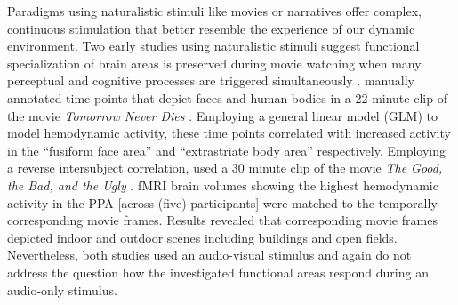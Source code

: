 \documentclass[english]{article}
\begin{document}
Paradigms using naturalistic stimuli like movies
\citep{hasson2008neurocinematics, sonkusare2019naturalistic} or narratives
\citep{honey2012not, lerner2011topographic, silbert2014coupled} offer complex,
continuous stimulation that better resemble the experience of our dynamic
environment.
Two early studies using naturalistic stimuli suggest functional specialization
of brain areas is preserved during movie watching when many perceptual and
cognitive processes are triggered simultaneously \citep{bartels2004mapping,
hasson2004intersubject}.
\cite{bartels2004mapping} manually annotated time points that depict faces and
human bodies in a 22 minute clip of the movie \textit{Tomorrow Never Dies}
\citep{tomorrowneverdies}.
Employing a general linear model (GLM) to model hemodynamic activity, these time
points correlated with increased activity in the ``fusiform face area''
\citep{kanwisher1997ffa} and ``extrastriate body area''
\citep{downing2001bodyarea} respectively.
Employing a reverse intersubject correlation, \cite{hasson2004intersubject} used
a 30 minute clip of the movie \textit{The Good, the Bad, and the Ugly}
\citep{goodbadugly}.
fMRI brain volumes showing the highest hemodynamic activity in the PPA [across
(five) participants] were matched to the temporally corresponding movie frames.
Results revealed that corresponding movie frames depicted indoor and outdoor
scenes including buildings and open fields.
Nevertheless, both studies used an audio-visual stimulus and again do not
address the question how the investigated functional areas respond during an
audio-only stimulus.

\end{document}
